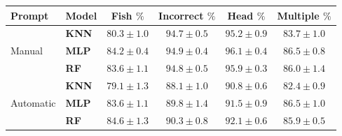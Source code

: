 \begin{table}[]
\centering
\begin{tabular}{ l l c c c c}
\hline
Prompt & Model & Fish $\%$ & Incorrect $\%$ & Head $\%$ & Multiple $\%$\\
\hline
\multirow{3}{*}{Manual}
 & \textbf{KNN} & $80.3 \pm 1.0$ & $94.7 \pm 0.5$ & $95.2 \pm 0.9$ & $83.7 \pm 1.0$ \\
 & \textbf{MLP} & $84.2 \pm 0.4$ & $94.9 \pm 0.4$ & $96.1 \pm 0.4$ & $86.5 \pm 0.8$ \\
 & \textbf{RF} & $83.6 \pm 1.1$ & $94.8 \pm 0.5$ & $95.9 \pm 0.3$ & $86.0 \pm 1.4$ \\
\hline
\multirow{3}{*}{Automatic}
 & \textbf{KNN} & $79.1 \pm 1.3$ & $88.1 \pm 1.0$ & $90.8 \pm 0.6$ & $82.4 \pm 0.9$ \\
 & \textbf{MLP} & $83.6 \pm 1.1$ & $89.8 \pm 1.4$ & $91.5 \pm 0.9$ & $86.5 \pm 1.0$ \\
 & \textbf{RF} & $84.6 \pm 1.3$ & $90.3 \pm 0.8$ & $92.1 \pm 0.6$ & $85.9 \pm 0.5$ \\
\hline
\end{tabular}
\end{table}

